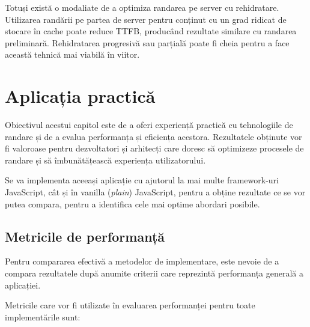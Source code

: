 \documentclass[12pt, a4paper]{report}
\begin{document}
Totuși există o modaliate de a optimiza randarea pe server cu rehidratare. Utilizarea randării pe partea de server pentru conținut cu un grad ridicat de stocare în cache poate reduce TTFB, producând rezultate similare cu randarea preliminară. Rehidratarea progresivă sau parțială poate fi cheia pentru a face această tehnică mai viabilă în viitor.



\chapter{Aplicația practică}

Obiectivul acestui capitol este de a oferi experiență practică cu tehnologiile de randare și de a evalua performanța și eficiența acestora. Rezultatele obținute vor fi valoroase pentru dezvoltatori și arhitecți care doresc să optimizeze procesele de randare și să îmbunătățească experiența utilizatorului.

Se va implementa aceeași aplicație cu ajutorul la mai multe framework-uri JavaScript, cât și în vanilla (\emph{plain}) JavaScript, pentru a obține rezultate ce se vor putea compara, pentru a identifica cele mai optime abordari posibile.


\section{Metricile de performanță}

Pentru compararea efectivă a metodelor de implementare, este nevoie de a compara rezultatele după anumite criterii care reprezintă performanța generală a aplicației.

Metricile care vor fi utilizate în evaluarea performanței pentru toate implementările sunt:
\end{document}
